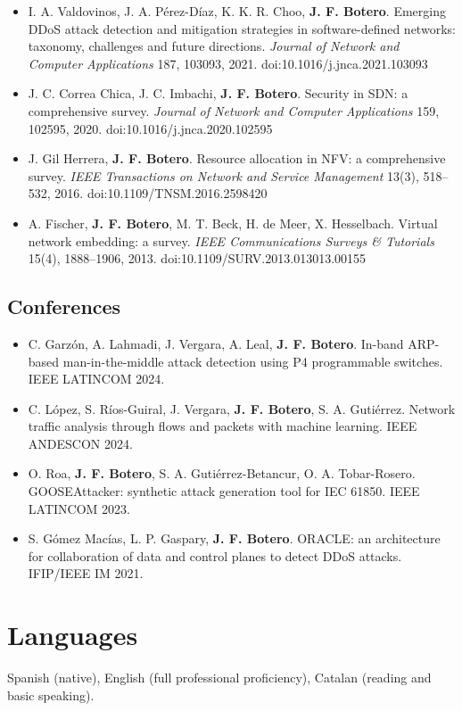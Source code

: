 \documentclass[10pt,a4paper]{article}
\newcommand{\me}{\textbf{J. F. Botero}}
\begin{document}
\begin{itemize}
\item I. A. Valdovinos, J. A. Pérez-Díaz, K. K. R. Choo, \me. Emerging DDoS attack detection and mitigation strategies in software-defined networks: taxonomy, challenges and future directions. \emph{Journal of Network and Computer Applications} 187, 103093, 2021. {\mono\footnotesize doi:10.1016/j.jnca.2021.103093}
\item J. C. Correa Chica, J. C. Imbachi, \me. Security in SDN: a comprehensive survey. \emph{Journal of Network and Computer Applications} 159, 102595, 2020. {\mono\footnotesize doi:10.1016/j.jnca.2020.102595}
\item J. Gil Herrera, \me. Resource allocation in NFV: a comprehensive survey. \emph{IEEE Transactions on Network and Service Management} 13(3), 518--532, 2016. {\mono\footnotesize doi:10.1109/TNSM.2016.2598420}
\item A. Fischer, \me, M. T. Beck, H. de Meer, X. Hesselbach. Virtual network embedding: a survey. \emph{IEEE Communications Surveys \& Tutorials} 15(4), 1888--1906, 2013. {\mono\footnotesize doi:10.1109/SURV.2013.013013.00155}
\end{itemize}
\subsection{Conferences}
\begin{itemize}
\item C. Garzón, A. Lahmadi, J. Vergara, A. Leal, \me. In-band ARP-based man-in-the-middle attack detection using P4 programmable switches. IEEE LATINCOM 2024.
\item C. López, S. Ríos-Guiral, J. Vergara, \me, S. A. Gutiérrez. Network traffic analysis through flows and packets with machine learning. IEEE ANDESCON 2024.
\item O. Roa, \me, S. A. Gutiérrez-Betancur, O. A. Tobar-Rosero. GOOSEAttacker: synthetic attack generation tool for IEC 61850. IEEE LATINCOM 2023.
\item S. Gómez Macías, L. P. Gaspary, \me. ORACLE: an architecture for collaboration of data and control planes to detect DDoS attacks. IFIP/IEEE IM 2021.
\end{itemize}

\section{Languages}
Spanish (native), English (full professional proficiency), Catalan (reading and basic speaking).
\end{document}
